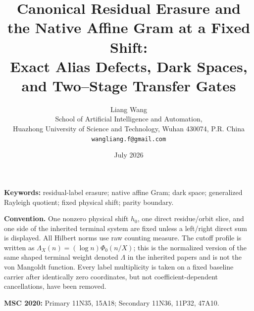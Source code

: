 \documentclass[11pt]{article}
\title{\bfseries Canonical Residual Erasure and the Native Affine Gram at a Fixed Shift:\\
Exact Alias Defects, Dark Spaces, and Two--Stage Transfer Gates}
\author{Liang Wang\\
\small School of Artificial Intelligence and Automation,\\[-2pt]
\small Huazhong University of Science and Technology, Wuhan 430074, P.R. China\\
\small \texttt{wangliang.f@gmail.com}}
\date{July 2026}
\theoremstyle{definition}
\theoremstyle{remark}
\begin{document}
\maketitle



\noindent\textbf{Keywords:} residual-label erasure; native affine Gram;
dark space; generalized Rayleigh quotient; fixed physical shift; parity boundary.

\medskip
\noindent\textbf{Convention.}
One nonzero physical shift \(h_0\), one direct residue/orbit slice, and one
side of the inherited terminal system are fixed unless a left/right direct
sum is displayed.  All Hilbert norms use raw counting measure.  The cutoff
profile is written as
\(\Lambda_X(n)=(\log n)\Phi_0(n/X)\); this is the normalized version of the
same shaped terminal weight denoted \(\Lambda\) in the inherited papers and
is not the von Mangoldt function.  Every label multiplicity is taken on a
fixed baseline carrier after identically zero coordinates, but not
coefficient-dependent cancellations, have been removed.

\medskip
\noindent\textbf{MSC 2020:} Primary 11N35, 15A18; Secondary 11N36,
11P32, 47A10.










\begingroup
\small
\raggedright
\setlength{\bibsep}{4pt plus 1pt minus 1pt}


\endgroup
\end{document}

